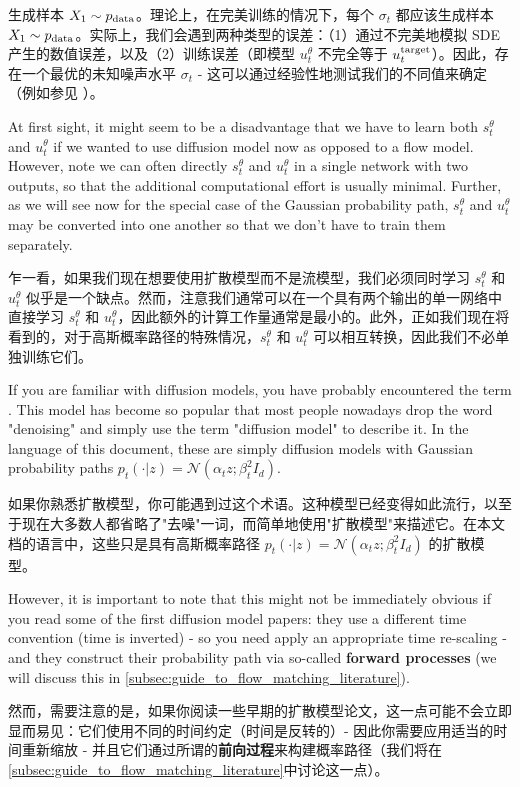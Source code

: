 生成样本 $X_1\sim p_{\rm{data}}$。理论上，在完美训练的情况下，每个 $\sigma_t$ 都应该生成样本 $X_1\sim p_{\rm{data}}$。实际上，我们会遇到两种类型的误差：（1）通过不完美地模拟 SDE 产生的数值误差，以及（2）训练误差（即模型 $u_t^{\theta}$ 不完全等于 $u^{\text{target}}_t$）。因此，存在一个最优的未知噪声水平 $\sigma_t$ - 这可以通过经验性地测试我们的不同值来确定（例如参见 \citep{albergo2023stochastic,karras2022elucidating,ma2024sit}）。

At first sight, it might seem to be a disadvantage that we have to learn both $s_t^\theta$ and $u_t^\theta$ if we wanted to use diffusion model now as opposed to a flow model. However, note we can often directly $s_t^\theta$ and $u_t^\theta$ in a single network with two outputs, so that the additional computational effort is usually minimal. Further, as we will see now for the special case of the Gaussian probability path, $s_t^\theta$ and $u_t^\theta$ may be converted into one another so that we don't have to train them separately.

乍一看，如果我们现在想要使用扩散模型而不是流模型，我们必须同时学习 $s_t^\theta$ 和 $u_t^\theta$ 似乎是一个缺点。然而，注意我们通常可以在一个具有两个输出的单一网络中直接学习 $s_t^\theta$ 和 $u_t^\theta$，因此额外的计算工作量通常是最小的。此外，正如我们现在将看到的，对于高斯概率路径的特殊情况，$s_t^\theta$ 和 $u_t^\theta$ 可以相互转换，因此我们不必单独训练它们。

\begin{remarkbox}If you are familiar with diffusion models, you have probably encountered the term . This model has become so popular that most people nowadays drop the word "denoising" and simply use the term "diffusion model" to describe it. In the language of this document, these are simply diffusion models with Gaussian probability paths $p_t(\cdot|z)=\mathcal{N}(\alpha_t z;\beta_t^2 I_d)$.

如果你熟悉扩散模型，你可能遇到过这个术语。这种模型已经变得如此流行，以至于现在大多数人都省略了"去噪"一词，而简单地使用"扩散模型"来描述它。在本文档的语言中，这些只是具有高斯概率路径 $p_t(\cdot|z)=\mathcal{N}(\alpha_t z;\beta_t^2 I_d)$ 的扩散模型。

However, it is important to note that this might not be immediately obvious if you read some of the first diffusion model papers: they use a different time convention (time is inverted) - so you need apply an appropriate time re-scaling - and they construct their probability path via so-called \textbf{forward processes} (we will discuss this in \cref{subsec:guide_to_flow_matching_literature}).

然而，需要注意的是，如果你阅读一些早期的扩散模型论文，这一点可能不会立即显而易见：它们使用不同的时间约定（时间是反转的）- 因此你需要应用适当的时间重新缩放 - 并且它们通过所谓的\textbf{前向过程}来构建概率路径（我们将在\cref{subsec:guide_to_flow_matching_literature}中讨论这一点）。
\end{remarkbox}

